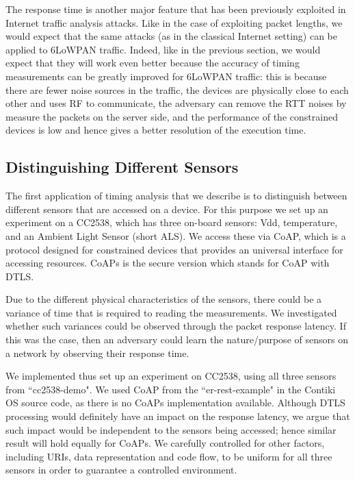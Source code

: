\documentclass{article}
\begin{document}
The response time is another major feature that has been previously exploited in Internet traffic analysis attacks. Like in the case of exploiting packet lengths, we would expect that the same attacks (as in the classical Internet setting) can be applied to 6LoWPAN traffic. Indeed, like in the previous section, we would expect that they will work even better because the accuracy of timing measurements can be greatly improved for 6LoWPAN traffic: this is because there are fewer noise sources in the traffic, the devices are physically close to each other and uses RF to communicate, the adversary can remove the RTT noises by measure the packets on the server side, and the performance of the constrained devices is low and hence gives a better resolution of the execution time.

\subsection{Distinguishing Different Sensors}
The first application of timing analysis that we describe is to distinguish between different sensors that are accessed on a device. For this purpose we set up an experiment on a CC2538, which has three on-board sensors: Vdd, temperature, and an Ambient Light Sensor (short ALS). We access these via CoAP\cite{rfc7252}, which is a protocol designed for constrained devices that provides an universal interface for accessing resources. CoAPs is the secure version which stands for CoAP with DTLS.

Due to the different physical characteristics of the sensors, there could be a variance of time that is required to reading the measurements. We investigated whether such variances could be observed through the packet response latency. If this was the case, then an adversary could learn the nature/purpose of sensors on a network by observing their response time. 

We implemented thus set up an experiment on CC2538, using all three sensors from ``cc2538-demo". We used CoAP from the ``er-rest-example" in the Contiki OS source code, as there is no CoAPs implementation available. Although DTLS processing would definitely have an impact on the response latency, we argue that such impact would be independent to the sensors being accessed; hence similar result will hold equally for CoAPs. We carefully controlled for other factors, including URIs, data representation and code flow, to be uniform for all three sensors in order to guarantee a controlled environment.
\end{document}
